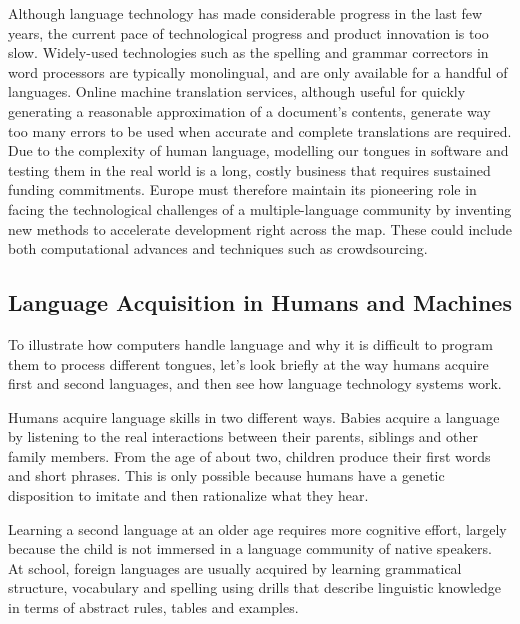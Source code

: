 \begin{multicols}{2}
Although language technology has made considerable progress in the
last few years, the current pace of technological progress and product
innovation is too slow. Widely-used technologies such as the spelling
and grammar correctors in word processors are typically monolingual,
and are only available for a handful of languages. Online machine
translation services, although useful for quickly generating a
reasonable approximation of a document's contents, generate way too
many errors to be used when accurate and complete translations are
required. Due to the complexity of human language, modelling our
tongues in software and testing them in the real world is a long,
costly business that requires sustained funding commitments. Europe
must therefore maintain its pioneering role in facing the
technological challenges of a multiple-language community by inventing
new methods to accelerate development right across the map. These
could include both computational advances and techniques such as
crowdsourcing.


\subsection{Language Acquisition in Humans and Machines}

To illustrate how computers handle language and why it is difficult to program them to process different tongues, let's look briefly at the way humans acquire first and second languages, and then see how language technology systems work.

Humans acquire language skills in two different ways. Babies acquire a language by listening to the real interactions between their parents, siblings and other family members. From the age of about two, children produce their first words and short phrases. This is only possible because humans have a genetic disposition to imitate and then rationalize what they hear. 

Learning a second language at an older age requires more cognitive effort, largely because the child is not immersed in a language community of native speakers. At school, foreign languages are usually acquired by learning grammatical structure, vocabulary and spelling using drills that describe linguistic knowledge in terms of abstract rules, tables and examples.



\end{multicols}
